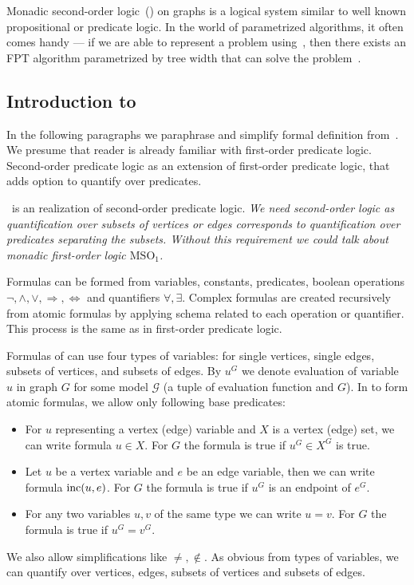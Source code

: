 Monadic second-order logic~(\MSO{}) on graphs is a logical system similar to
well known propositional or predicate logic.
In the world of parametrized algorithms,
it often comes handy --- if we are able to represent a problem using~\MSO{},
then there exists an FPT algorithm parametrized by tree width
that can solve the problem~\cite{tree_width_mso}.

\subsection{Introduction to~\MSO{}}

In the following paragraphs we paraphrase and simplify formal definition
from~\cite{book_parametrized_algorithms}.
We presume that reader is already familiar with first-order predicate logic.
Second-order predicate logic as an extension of first-order predicate logic,
that adds option to quantify over predicates.

\MSO{}~is an realization of second-order predicate logic.
\emph{
	We need second-order logic as quantification over subsets of vertices or edges
	corresponds to quantification over predicates separating the subsets.
	Without this requirement we could talk
	about monadic first-order logic \( \text{MSO}_1 \).
}

Formulas can be formed from
variables, constants, predicates,
boolean operations \( \lnot, \land, \lor, \Rightarrow, \Leftrightarrow \)
and quantifiers \( \forall, \exists \).
Complex formulas are created recursively from atomic formulas
by applying schema related to each operation or quantifier.
This process is the same as in first-order predicate logic.

Formulas of \MSO{} can use four types of variables:
for single vertices, single edges, subsets of vertices, and subsets of edges.
By \( u^G \) we denote evaluation of variable \( u \) in graph \( G \)
for some model \( \mathcal{G} \) (a tuple of evaluation function and \( G \)).
In \MSO{} to form atomic formulas, we allow only following base predicates:
%
\begin{itemize}
	\item For \( u \) representing a vertex (edge) variable
	      and \( X \) is a vertex (edge) set,
	      we can write formula \( u \in X \).
	      For \( G \) the formula is true if \( u^G \in X^G \) is true.
	\item Let \( u \) be a vertex variable and \( e \) be an edge variable,
	      then we can write formula \( \text{inc} (u, e) \).
	      For \( G \) the formula is true if \( u^G \) is an endpoint of \( e^G \).
	\item For any two variables \( u, v \) of the same type we can write \( u = v \).
	      For \( G \) the formula is true if \( u^G = v^G \).
\end{itemize}
%
We also allow simplifications like \( \ne, \not\in \).
As obvious from types of variables, we can quantify over vertices, edges,
subsets of vertices and subsets of edges.

